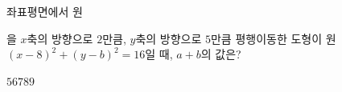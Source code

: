 좌표평면에서 원 \par\smallskip{}\par\smallskip\noindent 을 $x$축의 방향으로 $2$만큼, $y$축의 방향으로 $5$만큼 평행이동한 도형이 원~$(x-8)^2+(y-b)^2=16$일 때, $a+b$의 값은? 
\begin{choices32}{$5$}{$6$}{$7$}{$8$}{$9$}\end{choices32}
